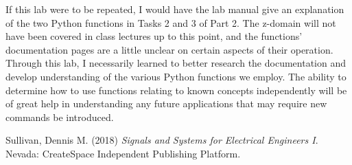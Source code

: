 \documentclass[12pt]{report}
\begin{document}
If this lab were to be repeated, I would have the lab manual give an explanation of the two Python functions in Tasks 2 and 3 of Part 2. The z-domain will not have been covered in class lectures up to this point, and the functions' documentation pages are a little unclear on certain aspects of their operation. Through this lab, I necessarily learned to better research the documentation and develop understanding of the various Python functions we employ. The ability to determine how to use functions relating to known concepts independently will be of great help in understanding any future applications that may require new commands be introduced.

\newpage
\begin{thebibliography}{111}
	
	Sullivan, Dennis M. (2018) {\it  Signals and Systems for Electrical Engineers I}. Nevada: CreateSpace Independent Publishing Platform.
	
\end{thebibliography}
\end{document}
